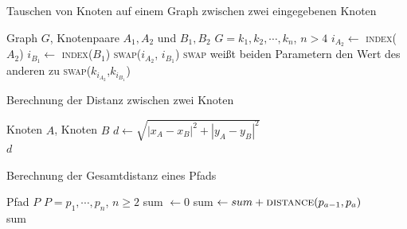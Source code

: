 \begin{algorithm}
    \caption{Tauschen von Knoten auf einem Graph zwischen zwei eingegebenen Knoten}\label{alg:test-alg}
    \begin{algorithmic}[1]
        \Require Graph $G$, Knotenpaare $A_1,A_2$ und $B_1,B_2$
        \Require $G=k_1,k_2,\cdots,k_n$, $n>4$
        \State $i_{A_2} \gets$ \textsc{index}($A_2$)
        \State $i_{B_1} \gets$ \textsc{index}($B_1$)
            \State \textsc{swap}($i_{A_2}$, $i_{B_1}$) 
            \Comment \textsc{swap} weißt beiden Parametern den Wert des anderen zu
        \EndIf
            \State \textsc{swap}($k_{i_{A_2}}$,$k_{i_{B_1}}$)
        \EndWhile
    \end{algorithmic}
\end{algorithm}

\begin{algorithm}
    \caption{Berechnung der Distanz zwischen zwei Knoten}
    \label{alg:calc-distance-two-nodes}
    \begin{algorithmic}[1]
        \Require Knoten $A$, Knoten $B$
        \State $d \gets \sqrt{|x_A - x_B|^2 + |y_A - y_B|^2}$\\
        \Return $d$
    \end{algorithmic}
\end{algorithm}

\begin{algorithm}
    \caption{Berechnung der Gesamtdistanz eines Pfads}
    \label{alg:calc-total-distance}
    \begin{algorithmic}[1]
        \Require Pfad $P$
        \Require $P=p_1,\cdots,p_n$, $n \geq 2$
        \State sum $\gets 0$
            \State sum $\gets sum + \textrm{\textsc{distance}}(p_{a-1}, p_a)$
        \EndFor\\
        \Return sum
    \end{algorithmic}
\end{algorithm}

